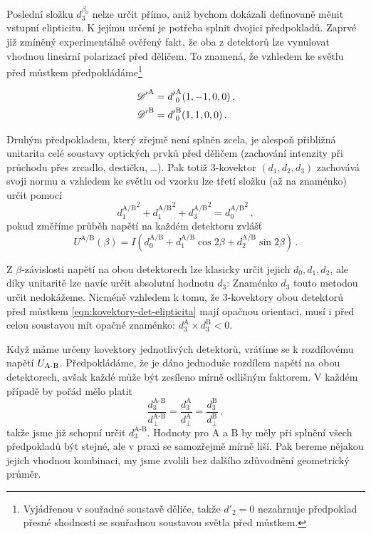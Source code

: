 Poslední složku $d^{\beta_0}_3$ nelze určit přímo, aniž bychom dokázali definovaně měnit vstupní elipticitu.
K jejímu určení je potřeba splnit dvojici předpokladů.
Zaprvé již zmíněný experimentálně ověřený fakt, že oba z detektorů lze vynulovat vhodnou lineární polarizací před děličem.
To znamená, že vzhledem ke světlu před můstkem předpokládáme\footnote{Vyjádřenou v souřadné soustavě děliče, takže $d'_2=0$ nezahrnuje předpoklad přesné shodnosti se souřadnou soustavou světla před můstkem.}

\begin{subequations}
\label{eqn:kovektory-det-elipticita}
\begin{align}
    {\mathscr{D}'}^\textrm{A} &= {d'}^{\textrm{A}}_0(1, -1, 0, 0) \,,\\
    {\mathscr{D}'}^\textrm{B} &= {d'}^\textrm{B}_0(1, 1, 0, 0) \,.
\end{align}
\end{subequations}

Druhým předpokladem, který zřejmě není splněn zcela, je alespoň přibližná unitarita celé soustavy optických prvků před děličem (zachování intenzity při průchodu přes zrcadlo, destičku, \ldots).
Pak totiž 3-kovektor $(d_1, d_2, d_3)$ zachovává svoji normu a vzhledem ke světlu od vzorku lze třetí složku (až na znaménko) určit pomocí
\begin{equation}
{d_1^\textrm{A/B}}^2 +  {d_1^\textrm{A/B}}^2 + {d_3^\textrm{A/B}}^2 = {d_0^\textrm{A/B}}^2 \,,
\end{equation}
pokud změříme průběh napětí na každém detektoru zvlášť
\begin{equation}
    U^\textrm{A/B}(\beta) = I \left( d^\textrm{A/B}_0 + d^\textrm{A/B}_1 \cos2\beta + d^\textrm{A/B}_2 \sin2\beta  \right) \,.
\end{equation}

Z $\beta$-závislosti napětí na obou detektorech lze klasicky určit jejich $d_0, d_1, d_2$, ale díky unitaritě lze navíc určit absolutní hodnotu $d_3$:
Znaménko $d_3$ touto metodou určit nedokážeme.
Nicméně vzhledem k tomu, že 3-kovektory obou detektorů před můstkem \eqref{eqn:kovektory-det-elipticita} mají opačnou orientaci, musí i před celou soustavou mít opačné znaménko: $d^\textrm{A}_3 \times d^\textrm{B}_3 < 0$.

Když máme určeny kovektory jednotlivých detektorů, vrátíme se k rozdílovému napětí $U_\textrm{A-B}$.
Předpokládáme, že je dáno jednoduše rozdílem napětí na obou detektorech, avšak každé může být zesíleno mírně odlišným faktorem.
V každém případě by pořád mělo platit
\begin{equation}
    \frac{d^\textrm{A-B}_3}{d^\textrm{A-B}_\perp} = \frac{d^\textrm{A}_3}{d^\textrm{A}_\perp} = \frac{d^\textrm{B}_3}{d^\textrm{B}_\perp} \,,
\end{equation}
takže jsme již schopní určit $d^\textrm{A-B}_3$.
Hodnoty pro A a B by měly při splnění všech předpokladů být stejné, ale v praxi se samozřejmě mírně liší.
Pak bereme nějakou jejich vhodnou kombinaci, my jsme zvolili bez dalšího zdůvodnění geometrický průměr.

